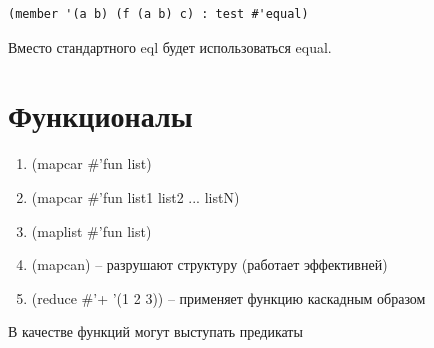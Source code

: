 \begin{lstlisting}
(member '(a b) (f (a b) c) : test #'equal)
\end{lstlisting}

Вместо стандартного {\ttfamily eql} будет использоваться
{\ttfamily equal}.

\section{Функционалы}

\begin{enumerate}
    \item {\ttfamily (mapcar \#'fun list)}
    \item {\ttfamily (mapcar \#'fun list1 list2 ... listN)}
    \item {\ttfamily (maplist \#'fun list)}
    \item {\ttfamily (mapcan)} --
        разрушают структуру (работает эффективней)
    \item {\ttfamily (reduce #'+ '(1 2 3))} --
        применяет функцию каскадным образом
\end{enumerate}

В качестве функций могут выступать предикаты
